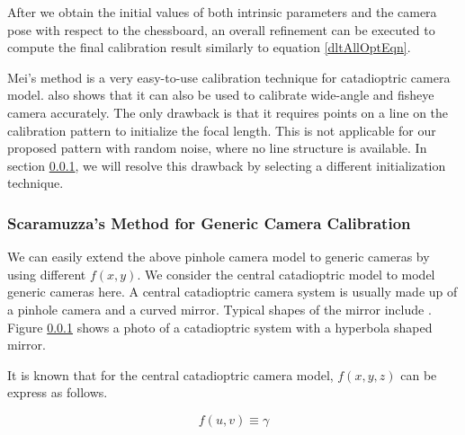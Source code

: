 \documentclass{report}
\begin{document}
After we obtain the initial values of both intrinsic parameters and the camera pose with respect to the chessboard, an overall refinement can be executed to compute the final calibration result similarly to equation \ref{dltAllOptEqn}. 

Mei's method is a very easy-to-use calibration technique for catadioptric camera model. \cite{mei2007single} also shows that it can also be used to calibrate wide-angle and fisheye camera accurately. The only drawback is that it requires points on a line on the calibration pattern to initialize the focal length. This is not applicable for our proposed pattern with random noise, where no line structure is available. In section \ref{}, we will resolve this drawback by selecting a different initialization technique. 

\subsubsection{Scaramuzza's Method for Generic Camera Calibration}


We can easily extend the above pinhole camera model to generic cameras by using different $f(x, y)$. We consider the central catadioptric model to model generic cameras here. A central catadioptric camera system is usually made up of a pinhole camera and a curved mirror. Typical shapes of the mirror include . Figure \ref{} shows a photo of a catadioptric system with a hyperbola shaped mirror. 

It is known \cite{} that for the central catadioptric camera model, $f(x, y, z)$ can be express as follows. 
\begin{equation}
\end{equation}


\begin{equation}
f(u, v) \equiv \gamma
\label{pinholeEqn}
\end{equation}
\end{document}
